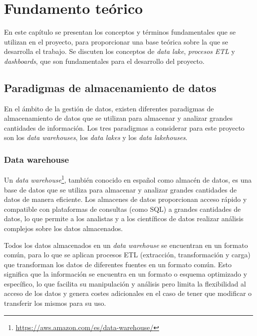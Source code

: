 \chapter{Fundamento teórico}\label{chap:teo}
En este capítulo se presentan los conceptos y términos fundamentales que se utilizan en el
proyecto, para proporcionar una base teórica sobre la que se desarrolla el trabajo. Se discuten
los conceptos de \textit{data lake}, \textit{procesos ETL} y \textit{dashboards}, que son
fundamentales para el desarrollo del proyecto.

\section{Paradigmas de almacenamiento de datos}\label{sec:paradigmas}
En el ámbito de la gestión de datos, existen diferentes paradigmas de almacenamiento de datos
que se utilizan para almacenar y analizar grandes cantidades de información. Los tres paradigmas
a considerar para este proyecto son los \textit{data warehouses}, los \textit{data lakes} y los
\textit{data lakehouses}.

\subsection{Data warehouse}\label{sec:warehouse}
Un \textit{data warehouse}\footnote{\url{https://aws.amazon.com/es/data-warehouse/}},
también conocido en español como almacén de datos, es una base de datos que se utiliza para
almacenar y analizar grandes cantidades de datos de manera eficiente. Los almacenes de datos
proporcionan acceso rápido y compatible con plataformas de consultas (como SQL) a grandes
cantidades de datos, lo que permite a los analistas y a los científicos de datos realizar
análisis complejos sobre los datos almacenados.

Todos los datos almacenados en un \textit{data warehouse} se encuentran en un formato común,
para lo que se aplican procesos ETL (extracción, transformación y carga) que transforman los
datos de diferentes fuentes en un formato común. Esto significa que la información se
encuentra en un formato o esquema optimizado y específico, lo que facilita su manipulación y
análisis pero limita la flexibilidad al acceso de los datos y genera costes adicionales en
el caso de tener que modificar o transferir los mismos para su uso.


